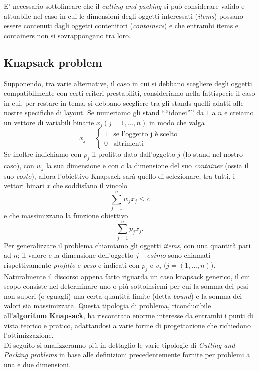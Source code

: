 \documentclass[12pt,a4paper,openright,twoside]{report}
\begin{document}
E' necessario sottolineare che il \textit{cutting and packing} si pu\`{o} considerare valido e attuabile nel caso in cui le dimensioni degli oggetti interessati (\textit{items}) possano essere contenuti dagli oggetti contenitori (\textit{containers}) e che entrambi items e containers non si sovrappongano tra loro.
\subsection{Knapsack problem}
Supponendo, tra varie alternative, il caso in cui si debbano scegliere degli oggetti compatibilmente con certi criteri prestabiliti, consideriamo nella fattispecie il caso in cui, per restare in tema, si debbano scegliere tra gli stands quelli adatti alle nostre specifiche di layout. Se numeriamo gli stand "`"`idonei"'"' da $1$ a $n$ e creiamo un vettore di variabili binarie $x_{j} (j = 1,...,n)$ in modo che valga
$$ 
x_{j} =  
\left\{
\begin{array}{rl}
1 & \mbox{se l'oggetto j \`{e} scelto}\\
0 & \mbox{altrimenti}
\end{array}
\right.
$$
Se inoltre indichiamo con $p_{j}$ il profitto dato dall'oggetto $j$ (lo stand nel nostro caso), con $w_{j}$ la sua dimensione e con $c$ la dimensione del suo \textit{container} (ossia il suo \textit{costo}), allora l'obiettivo Knapsack sar\`{a} quello di selezionare, tra tutti, i vettori binari $x$ che soddisfano il vincolo $$\sum^{n}_{j=1}w_{j}x_{j} \leq c$$ e che massimizzano la funzione obiettivo $$\sum^{n}_{j=1}p_{j}x_{j}.$$
Per generalizzare il problema chiamiamo gli oggetti \textit{items}, con una quantit\`{a} pari ad $n$; il valore e la dimensione dell'oggetto $j-esimo$ sono chiamati rispettivamente \textit{profitto} e \textit{peso} e indicati con $p_{j}$ e $v_{j}$ ($j = (1,...,n)$).
Naturalmente il discorso appena fatto riguarda un caso knapsack generico, il cui scopo consiste nel determinare uno o pi\`{u} sottoinsiemi per cui la somma dei pesi non superi (o eguagli) una certa quantit\`{a} limite (detta \textit{bound}) e la somma dei valori sia massimizzata. Questa tipologia di problema, riconducibile all'\textbf{algoritmo Knapsack}, ha riscontrato enorme interesse da entrambi i punti di vista teorico e pratico, adattandosi a varie forme di progettazione che richiedono l'ottimizzazione.\\
Di seguito si analizzeranno pi\`{u} in dettaglio le varie tipologie di \textit{Cutting and Packing problems} in base alle definizioni precedentemente fornite per problemi a una e due dimensioni.
\end{document}

